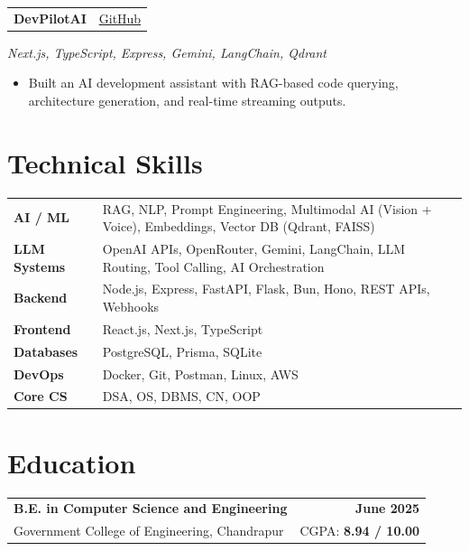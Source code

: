 \documentclass[a4paper,10pt]{article}
\begin{document}
\vspace{4pt}

\noindent
\begin{tabularx}{\textwidth}{@{}X r@{}}
  \textbf{DevPilotAI} &
  \href{https://github.com/alex-example/devpilot-ai}{\small GitHub}
\end{tabularx}
\textit{Next.js, TypeScript, Express, Gemini, LangChain, Qdrant}
\begin{itemize}
  \item Built an AI development assistant with RAG-based code querying, architecture generation, and real-time streaming outputs.
\end{itemize}

\section*{Technical Skills}

\newsavebox{\skillsbox}
\begin{lrbox}{\skillsbox}
\begin{tabularx}{\textwidth}{@{}>{\bfseries}p{2.8cm} X@{}}
  AI / ML          & RAG, NLP, Prompt Engineering, Multimodal AI (Vision + Voice), Embeddings, Vector DB (Qdrant, FAISS) \\
  LLM Systems      & OpenAI APIs, OpenRouter, Gemini, LangChain, LLM Routing, Tool Calling, AI Orchestration \\
  Backend          & Node.js, Express, FastAPI, Flask, Bun, Hono, REST APIs, Webhooks \\
  Frontend         & React.js, Next.js, TypeScript \\
  Databases        & PostgreSQL, Prisma, SQLite \\
  DevOps           & Docker, Git, Postman, Linux, AWS \\
  Core CS          & DSA, OS, DBMS, CN, OOP \\
\end{tabularx}
\end{lrbox}
\usebox{\skillsbox}

\section*{Education}

\noindent
\begin{tabularx}{\textwidth}{@{}X r@{}}
  \textbf{B.E. in Computer Science and Engineering} & \textbf{June 2025} \\
  Government College of Engineering, Chandrapur & CGPA: \textbf{8.94 / 10.00}
\end{tabularx}
\end{document}
